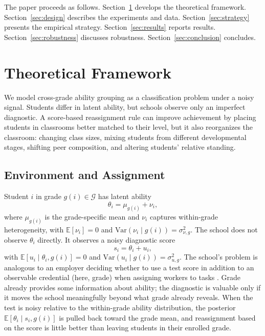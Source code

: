 \documentclass[11pt]{article}
\newcommand{\E}{\mathbb{E}}
\begin{document}
The paper proceeds as follows. Section~\ref{sec:theory} develops the theoretical framework. Section~\ref{sec:design} describes the experiments and data. Section~\ref{sec:strategy} presents the empirical strategy. Section~\ref{sec:results} reports results. Section~\ref{sec:robustness} discusses robustness. Section~\ref{sec:conclusion} concludes.

\section{Theoretical Framework}
\label{sec:theory}

We model cross-grade ability grouping as a classification problem under a noisy signal. Students differ in latent ability, but schools observe only an imperfect diagnostic. A score-based reassignment rule can improve achievement by placing students in classrooms better matched to their level, but it also reorganizes the classroom: changing class sizes, mixing students from different developmental stages, shifting peer composition, and altering students' relative standing.

\subsection{Environment and Assignment}

Student $i$ in grade $g(i) \in \mathcal{G}$ has latent ability
\begin{equation}
\label{eq:ability}
\theta_i = \mu_{g(i)} + \nu_i,
\end{equation}
where $\mu_{g(i)}$ is the grade-specific mean and $\nu_i$ captures within-grade heterogeneity, with $\E[\nu_i] = 0$ and $\text{Var}(\nu_i \mid g(i)) = \sigma^2_{\nu,g}$. The school does not observe $\theta_i$ directly. It observes a noisy diagnostic score
\begin{equation}
\label{eq:score}
s_i = \theta_i + u_i,
\end{equation}
with $\E[u_i \mid \theta_i, g(i)] = 0$ and $\text{Var}(u_i \mid g(i)) = \sigma^2_{u,g}$. The school's problem is analogous to an employer deciding whether to use a test score in addition to an observable credential (here, grade) when assigning workers to tasks \citep{AutorScarborough2008}. Grade already provides some information about ability; the diagnostic is valuable only if it moves the school meaningfully beyond what grade already reveals. When the test is noisy relative to the within-grade ability distribution, the posterior $\E[\theta_i \mid s_i, g(i)]$ is pulled back toward the grade mean, and reassignment based on the score is little better than leaving students in their enrolled grade.
\end{document}
